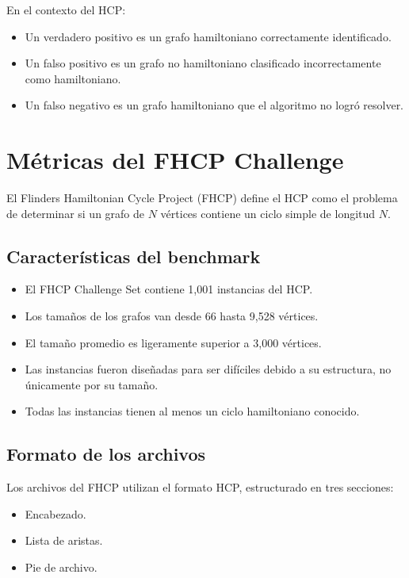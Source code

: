 \documentclass[12pt]{article}
\begin{document}
En el contexto del HCP:

\begin{itemize}
    \item Un verdadero positivo es un grafo hamiltoniano correctamente identificado.
    \item Un falso positivo es un grafo no hamiltoniano clasificado incorrectamente como hamiltoniano.
    \item Un falso negativo es un grafo hamiltoniano que el algoritmo no logró resolver.
\end{itemize}

\section{Métricas del FHCP Challenge}

El Flinders Hamiltonian Cycle Project (FHCP) define el HCP como el problema de determinar si un grafo de \(N\) vértices contiene un ciclo simple de longitud \(N\). \cite{fhcp}

\subsection{Características del benchmark}

\begin{itemize}
    \item El FHCP Challenge Set contiene 1{,}001 instancias del HCP. \cite{fhcpset}
    \item Los tamaños de los grafos van desde 66 hasta 9{,}528 vértices. \cite{fhcpset}
    \item El tamaño promedio es ligeramente superior a 3{,}000 vértices. \cite{fhcpset}
    \item Las instancias fueron diseñadas para ser difíciles debido a su estructura, no únicamente por su tamaño. \cite{haythorpe}
    \item Todas las instancias tienen al menos un ciclo hamiltoniano conocido. \cite{haythorpe}
\end{itemize}

\subsection{Formato de los archivos}

Los archivos del FHCP utilizan el formato HCP, estructurado en tres secciones:

\begin{itemize}
    \item Encabezado.
    \item Lista de aristas.
    \item Pie de archivo.
\end{itemize}
\end{document}

